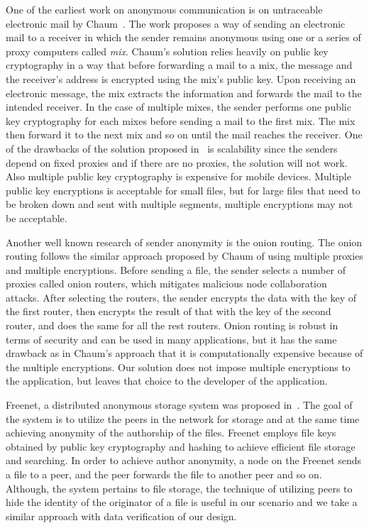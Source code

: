 
One of the earliest work on anonymous communication is on
untraceable electronic mail by
Chaum~\cite{DBLP:journals/cacm/Chaum81}. The work proposes a way
of sending an electronic mail to a receiver in which the sender
remains anonymous using one or a series of proxy computers called
\emph{mix}. Chaum's solution relies heavily on public key
cryptography in a way that before forwarding a mail to a mix, the
message and the receiver's address is encrypted using the mix's
public key. Upon receiving an electronic message, the mix extracts
the information and forwards the mail to the intended receiver. In
the case of multiple mixes, the sender performs one public key
cryptography for each mixes before sending a mail to the first
mix. The mix then forward it to the next mix and so on until the
mail reaches the receiver. One of the drawbacks of the solution
proposed in~\cite{DBLP:journals/cacm/Chaum81} is scalability since
the senders depend on fixed proxies and if there are no proxies,
the solution will not work. Also multiple public key cryptography
is expensive for mobile devices. Multiple public key encryptions
is acceptable for small files, but for large files that need to be
broken down and sent with multiple segments, multiple encryptions
may not be acceptable.

Another well known research of sender anonymity is the onion
routing\cite{DBLP:conf/uss/DingledineMS04}. The onion routing
follows the similar approach proposed by Chaum of using multiple
proxies and multiple encryptions. Before sending a file, the
sender selects a number of proxies called onion routers, which
mitigates malicious node collaboration attacks. After selecting
the routers, the sender encrypts the data with the key of the
first router, then encrypts the result of that with the key of the
second router, and does the same for all the rest routers. Onion
routing is robust in terms of security and can be used in many
applications, but it has the same drawback as in Chaum's approach
that it is computationally expensive because of the multiple
encryptions. Our solution does not impose multiple encryptions to
the application, but leaves that choice to the developer of the
application.

Freenet, a distributed anonymous storage system was proposed
in~\cite{DBLP:conf/diau/ClarkeSWH00}. The goal of the system is to
utilize the peers in the network for storage and at the same time
achieving anonymity of the authorship of the files. Freenet
employs file keys obtained by public key cryptography and hashing
to achieve efficient file storage and searching. In order to
achieve author anonymity, a node on the Freenet sends a file to a
peer, and the peer forwards the file to another peer and so on.
Although, the system pertains to file storage, the technique of
utilizing peers to hide the identity of the originator of a file
is useful in our scenario and we take a similar approach with data
verification of our design.


